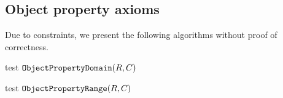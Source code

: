 \documentclass[paper.tex]{subfiles}
\begin{document}
\subsection{Object property axioms}
\label{sec:algorithms:objprop}

Due to constraints, we present the following algorithms without proof of correctness.  



\begin{algorithm}[H]
  \caption{test $\mathtt{ObjectPropertyDomain}(R, C)$}
  \begin{algorithmic}[1]
    \raggedright
      \State \todo
    \EndFunction
  \end{algorithmic}
\end{algorithm}

\begin{algorithm}[H]
  \caption{test $\mathtt{ObjectPropertyRange}(R, C)$}
  \begin{algorithmic}[1]
    \raggedright
      \State \todo
    \EndFunction
  \end{algorithmic}
\end{algorithm}
\end{document}
